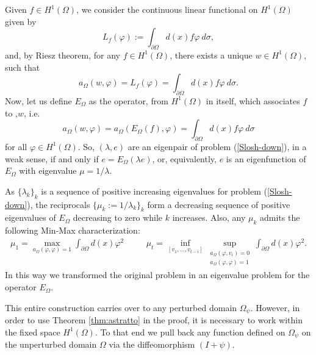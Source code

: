 \documentclass[a4paper,reqno,11pt,oneside]{amsart}
\theoremstyle{plain}
\theoremstyle{plain}
\theoremstyle{plain}
\theoremstyle{remark}
\begin{document}
Given $f\in H^1(\Omega)$, we consider the continuous linear functional on $H^1(\Omega)$ given by
$$
L_f(\varphi):=\int_{\partial\Omega} d(x)f\varphi\  d\sigma,
$$
and, by Riesz theorem, for any $f\in H^1(\Omega)$, there exists a unique $w\in H^1(\Omega)$, such that 
\[
a_{\Omega}(w,\varphi)=L_f (\varphi)=\int_{\partial \Omega} d(x)f\varphi\  d\sigma .
\]
Now, let us define $E_\Omega$ as the operator, from $ H^1(\Omega)$ in itself, which associates $f$ to ,$w$, i.e. 
\begin{equation}\label{eq:Eusimp}
 a_{\Omega}(w,\varphi)=a_{\Omega}(E_\Omega(f),\varphi)=\int_{\partial \Omega} d(x)f\varphi\  d\sigma 
\end{equation}
for all $\varphi \in H^1 (\Omega)$. So,  $(\lambda, e)$ are an eigenpair of problem (\ref{Slosh-down}), in a weak sense, if and only if $e=E_\Omega(\lambda e)$, or, equivalently, $e$ is an eigenfunction of $E_\Omega$ with eigenvalue $\mu=1/\lambda$.


As $\{\lambda_k\}_k$ is a sequence of positive increasing eigenvalues for problem 
(\ref{Slosh-down}), the reciprocals  $\{\mu_k:=1/\lambda_k\}_k$  form a decreasing sequence of positive eigenvalues of $E_\Omega $ decreasing to zero while $k$ increases. Also, any $\mu_k$ admits the following Min-Max characterization:
\begin{eqnarray*}  
\mu_1= \max_{a_\Omega(\varphi,\varphi)=1}\int_{\partial\Omega} d(x)\varphi^2
&\quad&
\mu_t= 
\inf_{[v_1,\dots,v_{t-i}]}
\sup_{
\begin{array}{c}
a_\Omega(\varphi,v_i)=0\\
a_\Omega(\varphi,\varphi)=1
\end{array}}\int_{\partial\Omega} d(x)\varphi^2.
\end{eqnarray*}
In this way we transformed the original problem in an eigenvalue problem for the operator $E_\Omega$. 

This entire construction carries over to any perturbed domain $\Omega_\psi$. However, in order to use Theorem \ref{thm:astratto} in the proof,  it is necessary to work within the fixed space ${H^1}(\Omega)$. To that end we pull back any function defined on $\Omega_\psi$ on the unperturbed domain $\Omega$ via the diffeomorphism $(I+\psi)$.  
\end{document}
